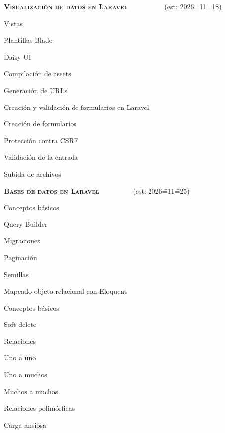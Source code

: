 \begin{longenum}
    \item \textbf{\textsc{Visualización de datos en Laravel}} \ \ \ \ \ \ \ \ \ \ (est: 2026\==11\==18)
    \begin{longenum}
        \item Vistas
        \item Plantillas Blade
        \item Daisy UI
        \item Compilación de assets
        \item Generación de URLs
        \item Creación y validación de formularios en Laravel
        \begin{longenum}
            \item Creación de formularios
            \item Protección contra CSRF
            \item Validación de la entrada
            \item Subida de archivos
        \end{longenum}
    \end{longenum}
    \item \textbf{\textsc{Bases de datos en Laravel}} \ \ \ \ \ \ \ \ \ (est: 2026\==11\==25)
    \begin{longenum}
        \item Conceptos básicos
        \item Query Builder
        \item Migraciones
        \item Paginación
        \item Semillas
        \item Mapeado objeto-relacional con Eloquent
        \begin{longenum}
            \item Conceptos básicos
            \item Soft delete
            \item Relaciones
            \begin{longenum}
                \item Uno a uno
                \item Uno a muchos
                \item Muchos a muchos
                \item Relaciones polimórficas
                \item Carga ansiosa

\end{longenum}
\end{longenum}
\end{longenum}
\end{longenum}

